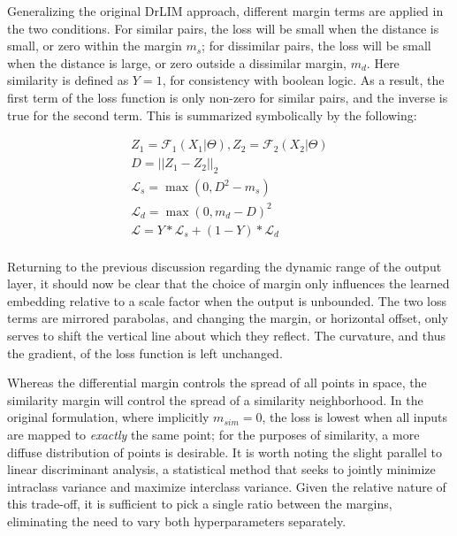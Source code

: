 Generalizing the original DrLIM approach, different margin terms are applied in the two conditions.
For similar pairs, the loss will be small when the distance is small, or zero within the margin $m_s$;
for dissimilar pairs, the loss will be small when the distance is large, or zero outside a dissimilar margin, $m_d$.
Here similarity is defined as $Y=1$, for consistency with boolean logic.
As a result, the first term of the loss function is only non-zero for similar pairs, and the inverse is true for the second term.
This is summarized symbolically by the following:

\begin{align*}
Z_1 = \mathcal{F}_1(X_1 | \Theta), Z_2 = \mathcal{F}_2(X_2 | \Theta)\\
D = || Z_1 - Z_2 ||_2\\
\mathcal{L}_{s} = \max(0, D^2 - m_{s})\\
\mathcal{L}_{d} = \max(0, m_{d} - D)^2\\
\mathcal{L} = Y * \mathcal{L}_{s} + (1 - Y) * \mathcal{L}_{d} \\
\end{align*}

Returning to the previous discussion regarding the dynamic range of the output layer, it should now be clear that the choice of margin only influences the learned embedding relative to a scale factor when the output is unbounded.
The two loss terms are mirrored parabolas, and changing the margin, or horizontal offset, only serves to shift the vertical line about which they reflect.
The curvature, and thus the gradient, of the loss function is left unchanged.


Whereas the differential margin controls the spread of all points in space, the similarity margin will control the spread of a similarity neighborhood.
In the original formulation, where implicitly $m_{sim} = 0$, the loss is lowest when all inputs are mapped to \emph{exactly} the same point; for the purposes of similarity, a more diffuse distribution of points is desirable.
It is worth noting the slight parallel to linear discriminant analysis, a statistical method that seeks to jointly minimize intraclass variance and maximize interclass variance.
Given the relative nature of this trade-off, it is sufficient to pick a single ratio between the margins, eliminating the need to vary both hyperparameters separately.


